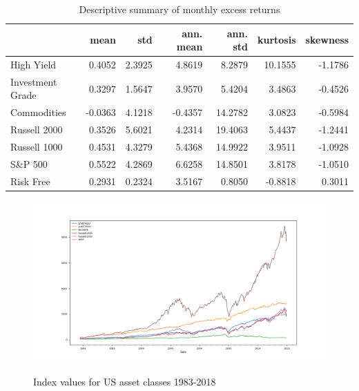 \documentclass[11pt,a4paper,oneside]{article}
\begin{document}
\begin{table}[h!]
\centering
\caption{Descriptive summary of monthly excess returns}
\label{descriptive_statistics}
\begin{tabular}{lrrrrrr}
\toprule
{} &    mean &     std &  ann. mean &  ann. std &  kurtosis &  skewness \\
\midrule
High Yield       &  0.4052 &  2.3925 &     4.8619 &    8.2879 &   10.1555 &   -1.1786 \\
Investment Grade &  0.3297 &  1.5647 &     3.9570 &    5.4204 &    3.4863 &   -0.4526 \\
Commodities      & -0.0363 &  4.1218 &    -0.4357 &   14.2782 &    3.0823 &   -0.5984 \\
Russell 2000     &  0.3526 &  5.6021 &     4.2314 &   19.4063 &    5.4437 &   -1.2441 \\
Russell 1000     &  0.4531 &  4.3279 &     5.4368 &   14.9922 &    3.9511 &   -1.0928 \\
S\&P 500          &  0.5522 &  4.2869 &     6.6258 &   14.8501 &    3.8178 &   -1.0510 \\
Risk Free        &  0.2931 &  0.2324 &     3.5167 &    0.8050 &   -0.8818 &    0.3011 \\
\bottomrule
\end{tabular}
    \label{returnstats}
\end{table}



   












\clearpage

\begin{figure}[ht]
\center
\caption{Index values for US asset classes 1983-2018}
\vspace{-4.9mm}
\label{index_levels}
\includegraphics[scale=0.5]{images/index_abs.png}
\begingroup
{}
\endgroup
\end{figure}
\end{document}
